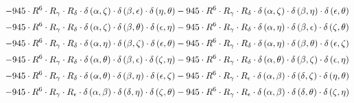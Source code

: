 \begin{subequations}
\begin{gather}
 \\[0.2em] \notag 		 - 945 \cdot R^{6} \cdot R_{\gamma{}} \cdot R_{\delta{}} \cdot \delta{}\left(\alpha{}, \zeta{}\right) \cdot \delta{}\left(\beta{}, \epsilon{}\right) \cdot \delta{}\left(\eta{}, \theta{}\right)- 945 \cdot R^{6} \cdot R_{\gamma{}} \cdot R_{\delta{}} \cdot \delta{}\left(\alpha{}, \zeta{}\right) \cdot \delta{}\left(\beta{}, \eta{}\right) \cdot \delta{}\left(\epsilon{}, \theta{}\right) 
 \\[0.2em] \notag 		 - 945 \cdot R^{6} \cdot R_{\gamma{}} \cdot R_{\delta{}} \cdot \delta{}\left(\alpha{}, \zeta{}\right) \cdot \delta{}\left(\beta{}, \theta{}\right) \cdot \delta{}\left(\epsilon{}, \eta{}\right)- 945 \cdot R^{6} \cdot R_{\gamma{}} \cdot R_{\delta{}} \cdot \delta{}\left(\alpha{}, \eta{}\right) \cdot \delta{}\left(\beta{}, \epsilon{}\right) \cdot \delta{}\left(\zeta{}, \theta{}\right) 
 \\[0.2em] \notag 		 - 945 \cdot R^{6} \cdot R_{\gamma{}} \cdot R_{\delta{}} \cdot \delta{}\left(\alpha{}, \eta{}\right) \cdot \delta{}\left(\beta{}, \zeta{}\right) \cdot \delta{}\left(\epsilon{}, \theta{}\right)- 945 \cdot R^{6} \cdot R_{\gamma{}} \cdot R_{\delta{}} \cdot \delta{}\left(\alpha{}, \eta{}\right) \cdot \delta{}\left(\beta{}, \theta{}\right) \cdot \delta{}\left(\epsilon{}, \zeta{}\right) 
 \\[0.2em] \notag 		 - 945 \cdot R^{6} \cdot R_{\gamma{}} \cdot R_{\delta{}} \cdot \delta{}\left(\alpha{}, \theta{}\right) \cdot \delta{}\left(\beta{}, \epsilon{}\right) \cdot \delta{}\left(\zeta{}, \eta{}\right)- 945 \cdot R^{6} \cdot R_{\gamma{}} \cdot R_{\delta{}} \cdot \delta{}\left(\alpha{}, \theta{}\right) \cdot \delta{}\left(\beta{}, \zeta{}\right) \cdot \delta{}\left(\epsilon{}, \eta{}\right) 
 \\[0.2em] \notag 		 - 945 \cdot R^{6} \cdot R_{\gamma{}} \cdot R_{\delta{}} \cdot \delta{}\left(\alpha{}, \theta{}\right) \cdot \delta{}\left(\beta{}, \eta{}\right) \cdot \delta{}\left(\epsilon{}, \zeta{}\right)- 945 \cdot R^{6} \cdot R_{\gamma{}} \cdot R_{\epsilon{}} \cdot \delta{}\left(\alpha{}, \beta{}\right) \cdot \delta{}\left(\delta{}, \zeta{}\right) \cdot \delta{}\left(\eta{}, \theta{}\right) 
 \\[0.2em] \notag 		 - 945 \cdot R^{6} \cdot R_{\gamma{}} \cdot R_{\epsilon{}} \cdot \delta{}\left(\alpha{}, \beta{}\right) \cdot \delta{}\left(\delta{}, \eta{}\right) \cdot \delta{}\left(\zeta{}, \theta{}\right)- 945 \cdot R^{6} \cdot R_{\gamma{}} \cdot R_{\epsilon{}} \cdot \delta{}\left(\alpha{}, \beta{}\right) \cdot \delta{}\left(\delta{}, \theta{}\right) \cdot \delta{}\left(\zeta{}, \eta{}\right) 

\end{gather}
\end{subequations}
